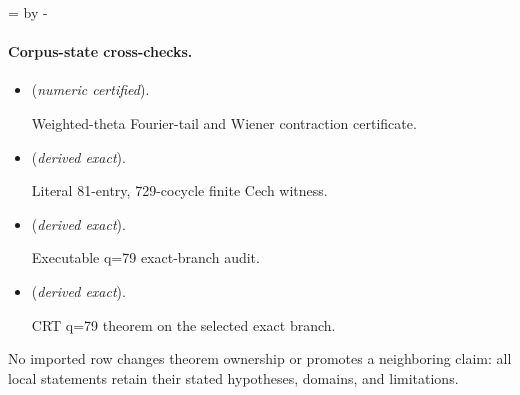 \documentclass[11pt]{article}
\theoremstyle{definition}
\theoremstyle{remark}
\begin{document}
\par\begingroup{}=\pagegoal\advance{} by -\pagetotal\ifdim\dimen0<7\baselineskip\newpage\fi\endgroup
\paragraph{Corpus-state cross-checks.}
\begin{itemize}
\setlength{\itemsep}{0.25em}
\item {} (\emph{numeric certified}).\par Weighted-theta Fourier-tail and Wiener contraction certificate.
\item {} (\emph{derived exact}).\par Literal 81-entry, 729-cocycle finite Cech witness.
\item {} (\emph{derived exact}).\par Executable q=79 exact-branch audit.
\item {} (\emph{derived exact}).\par CRT q=79 theorem on the selected exact branch.
\end{itemize}

No imported row changes theorem ownership or promotes a neighboring claim: all local statements retain their stated hypotheses, domains, and limitations.


\end{document}
